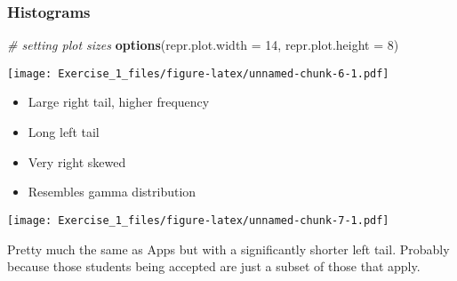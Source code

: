 \documentclass[]{article}
\newenvironment{Shaded}{\begin{snugshade}}{\end{snugshade}}
\newcommand{\CommentTok}[1]{\textcolor[rgb]{0.56,0.35,0.01}{\textit{#1}}}
\newcommand{\DataTypeTok}[1]{\textcolor[rgb]{0.13,0.29,0.53}{#1}}
\newcommand{\DecValTok}[1]{\textcolor[rgb]{0.00,0.00,0.81}{#1}}
\newcommand{\KeywordTok}[1]{\textcolor[rgb]{0.13,0.29,0.53}{\textbf{#1}}}
\newcommand{\NormalTok}[1]{#1}
\newcommand{\OperatorTok}[1]{\textcolor[rgb]{0.81,0.36,0.00}{\textbf{#1}}}
\providecommand{\tightlist}{%
  \setlength{\itemsep}{0pt}\setlength{\parskip}{0pt}}
\begin{document}
\hypertarget{histograms}{%
\subsubsection{Histograms}\label{histograms}}

\begin{Shaded}
\begin{Highlighting}[]
\CommentTok{# setting plot sizes}
\KeywordTok{options}\NormalTok{(}\DataTypeTok{repr.plot.width =} \DecValTok{14}\NormalTok{, }\DataTypeTok{repr.plot.height =} \DecValTok{8}\NormalTok{)}
\end{Highlighting}
\end{Shaded}

\begin{Shaded}
\end{Shaded}

\texttt{[image: Exercise\_1\_files/figure-latex/unnamed-chunk-6-1.pdf]}

\begin{itemize}
\tightlist
\item
  Large right tail, higher frequency
\item
  Long left tail
\item
  Very right skewed
\item
  Resembles gamma distribution
\end{itemize}

\begin{Shaded}
\end{Shaded}

\texttt{[image: Exercise\_1\_files/figure-latex/unnamed-chunk-7-1.pdf]}

Pretty much the same as Apps but with a significantly shorter left tail.
Probably because those students being accepted are just a subset of
those that apply.

\begin{Shaded}
\end{Shaded}
\end{document}
